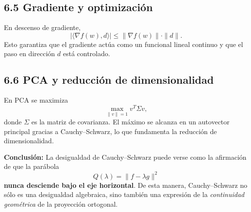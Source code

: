 \documentclass[12pt]{article}
\begin{document}
\subsection*{6.5 Gradiente y optimización}
En descenso de gradiente,
\[
|\langle \nabla f(w), d\rangle| \leq \|\nabla f(w)\| \cdot \|d\|.
\]
Esto garantiza que el gradiente actúa como un funcional lineal continuo 
y que el paso en dirección $d$ está controlado.

\subsection*{6.6 PCA y reducción de dimensionalidad}
En PCA se maximiza
\[
\max_{\|v\|=1} v^T \Sigma v,
\]
donde $\Sigma$ es la matriz de covarianza. 
El máximo se alcanza en un autovector principal gracias a Cauchy--Schwarz, 
lo que fundamenta la reducción de dimensionalidad.

\bigskip
\noindent
\textbf{Conclusión:}  
La desigualdad de Cauchy--Schwarz puede verse como la afirmación de que la parábola
\[
Q(\lambda) = \|f - \lambda g\|^2
\]
\textbf{nunca desciende bajo el eje horizontal}.  
De esta manera, Cauchy--Schwarz no sólo es una desigualdad algebraica, 
sino también una expresión de la \emph{continuidad geométrica} de la proyección ortogonal.
\end{document}
